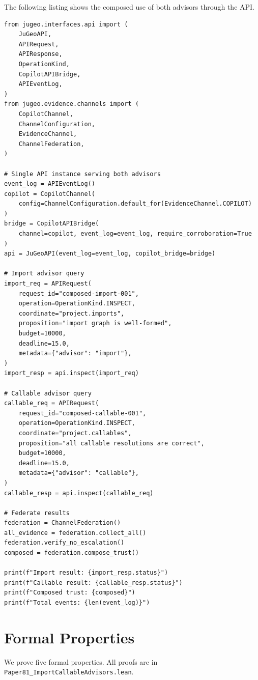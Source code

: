 \documentclass[11pt]{article}
\begin{document}
The following listing shows the composed use of both advisors
through the API.

\begin{lstlisting}[style=jugeo-python, caption={Composed import and callable advisory through the API.}, label=lst:composed]
from jugeo.interfaces.api import (
    JuGeoAPI,
    APIRequest,
    APIResponse,
    OperationKind,
    CopilotAPIBridge,
    APIEventLog,
)
from jugeo.evidence.channels import (
    CopilotChannel,
    ChannelConfiguration,
    EvidenceChannel,
    ChannelFederation,
)

# Single API instance serving both advisors
event_log = APIEventLog()
copilot = CopilotChannel(
    config=ChannelConfiguration.default_for(EvidenceChannel.COPILOT)
)
bridge = CopilotAPIBridge(
    channel=copilot, event_log=event_log, require_corroboration=True
)
api = JuGeoAPI(event_log=event_log, copilot_bridge=bridge)

# Import advisor query
import_req = APIRequest(
    request_id="composed-import-001",
    operation=OperationKind.INSPECT,
    coordinate="project.imports",
    proposition="import graph is well-formed",
    budget=10000,
    deadline=15.0,
    metadata={"advisor": "import"},
)
import_resp = api.inspect(import_req)

# Callable advisor query
callable_req = APIRequest(
    request_id="composed-callable-001",
    operation=OperationKind.INSPECT,
    coordinate="project.callables",
    proposition="all callable resolutions are correct",
    budget=10000,
    deadline=15.0,
    metadata={"advisor": "callable"},
)
callable_resp = api.inspect(callable_req)

# Federate results
federation = ChannelFederation()
all_evidence = federation.collect_all()
federation.verify_no_escalation()
composed = federation.compose_trust()

print(f"Import result: {import_resp.status}")
print(f"Callable result: {callable_resp.status}")
print(f"Composed trust: {composed}")
print(f"Total events: {len(event_log)}")
\end{lstlisting}

\section{Formal Properties}
\label{sec:formal}

We prove five formal properties.  All proofs are in
\texttt{Paper81\_ImportCallableAdvisors.lean}.
\end{document}
